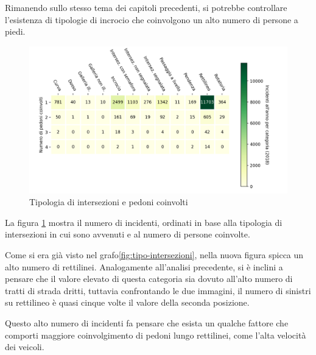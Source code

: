\documentclass[a4paper,12pt]{report}
\begin{document}
Rimanendo sullo stesso tema dei capitoli precedenti, 
si potrebbe controllare l'esistenza di tipologie di incrocio che 
coinvolgono un alto numero di persone a piedi. 

\begin{figure}
    \includegraphics[width=\linewidth]{../src/incidenti/incidenti_senza_coords/pedoni/pedoni_incroci.png}
    \caption{Tipologia di intersezioni e pedoni coinvolti}
    \label{fig:pedoni-intersezioni}
\end{figure}

La figura \ref{fig:pedoni-intersezioni} mostra il numero di incidenti, 
ordinati in base alla tipologia di intersezioni in cui sono avvenuti 
e al numero di persone coinvolte.

Come si era già visto nel grafo\ref{fig:tipo-intersezioni}, nella nuova 
figura spicca un alto numero di rettilinei. 
Analogamente all'analisi precedente, si è inclini a pensare che il valore 
elevato di questa categoria sia dovuto all'alto 
numero di tratti di strada dritti, tuttavia confrontando le due immagini, 
il numero di sinistri su rettilineo è quasi cinque 
volte il valore della seconda posizione.

Questo alto numero di incidenti fa pensare che esista un qualche fattore 
che comporti maggiore coinvolgimento di pedoni lungo rettilinei, come 
l'alta velocità dei veicoli.
\end{document}
